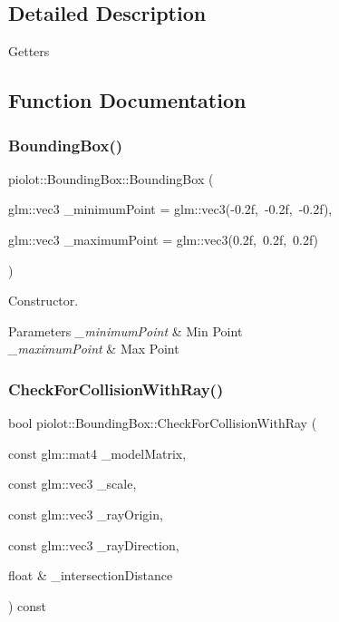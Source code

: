 \subsection{Detailed Description}
Getters 

\subsection{Function Documentation}
\mbox{\label{group___getters_ga699e27e8e646be7a0a47f89abb35778d}} 
\subsubsection{\texorpdfstring{Bounding\+Box()}{BoundingBox()}}
{\footnotesize\ttfamily piolot\+::\+Bounding\+Box\+::\+Bounding\+Box (\begin{DoxyParamCaption}\item[{glm\+::vec3}]{\+\_\+minimum\+Point = {\ttfamily glm\+:\+:vec3(-\/0.2f,~-\/0.2f,~-\/0.2f)},  }\item[{glm\+::vec3}]{\+\_\+maximum\+Point = {\ttfamily glm\+:\+:vec3(0.2f,~0.2f,~0.2f)} }\end{DoxyParamCaption})\hspace{0.3cm}{\ttfamily [explicit]}}



Constructor. 


\begin{DoxyParams}{Parameters}
{\em \+\_\+minimum\+Point} & Min Point \\
\hline
{\em \+\_\+maximum\+Point} & Max Point \\
\hline
\end{DoxyParams}
\mbox{\label{group___getters_ga552fcdb461cdc71c5da0fed7b486246d}} 
\subsubsection{\texorpdfstring{Check\+For\+Collision\+With\+Ray()}{CheckForCollisionWithRay()}}
{\footnotesize\ttfamily bool piolot\+::\+Bounding\+Box\+::\+Check\+For\+Collision\+With\+Ray (\begin{DoxyParamCaption}\item[{const glm\+::mat4}]{\+\_\+model\+Matrix,  }\item[{const glm\+::vec3}]{\+\_\+scale,  }\item[{const glm\+::vec3}]{\+\_\+ray\+Origin,  }\item[{const glm\+::vec3}]{\+\_\+ray\+Direction,  }\item[{float \&}]{\+\_\+intersection\+Distance }\end{DoxyParamCaption}) const}



